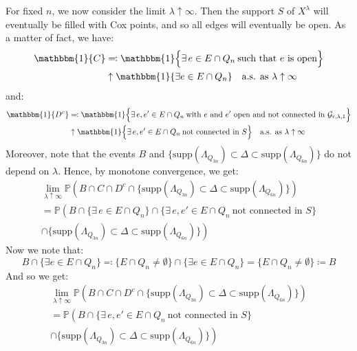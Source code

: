 \documentclass[10pt,a4paper]{amsart}
\theoremstyle{exampstyle}
\theoremstyle{exampnotations}
\begin{document}
For fixed $n$, we now consider the limit $\lambda \uparrow \infty$. Then the support $S$ of $X^{\lambda}$ will eventually be filled with Cox points, and so all edges will eventually be open. As a matter of fact, we have:
\begin{align*}
    \mathbbm{1} \lbrace C \rbrace &\eqqcolon \mathbbm{1} \Big\lbrace \exists \, e \in E\cap Q_n \: \text{such that $e$ is open} \Big\rbrace 
    \\ &\uparrow \mathbbm{1} \lbrace \exists e \in E\cap Q_n \rbrace \quad \text{a.s. as $\lambda \uparrow \infty$}
\end{align*}
and: \begin{align*}
     \mathbbm{1} \lbrace D^c \rbrace &\eqqcolon \mathbbm{1} \Big\lbrace \exists \, e,e' \in E\cap Q_n \: \text{with $e$ and $e'$ open and not connected in } \mathcal{G}_{r,\lambda,1}  \Big\rbrace 
     \\ &\uparrow \mathbbm{1} \Big\lbrace \exists \, e,e' \in E\cap Q_n \: \text{not connected in } S  \Big\rbrace \quad \text{a.s. as $\lambda \uparrow \infty$}
\end{align*}
Moreover, note that the events $B$ and $\Big\lbrace \text{supp}(\Lambda_{Q_{3n}}) \subset \Delta \subset \text{supp}(\Lambda_{Q_{6n}}) \Big\rbrace$ do not depend on $\lambda$. Hence, by monotone convergence, we get:
\begin{gather*}
    \lim_{\lambda \uparrow \infty} \mathbb{P}\left(B \cap C \cap D^c  \cap \Big\lbrace \text{supp}(\Lambda_{Q_{3n}}) \subset \Delta \subset \text{supp}(\Lambda_{Q_{6n}}) \Big\rbrace \right) 
    \\ = \mathbb{P}\left(B \cap \Big\lbrace \exists \, e \in E \cap Q_n \Big\rbrace \cap \Big\lbrace \exists \, e,e' \in E\cap Q_n \: \text{not connected in } S  \Big\rbrace \right. \\ \left. \cap \Big\lbrace \text{supp}(\Lambda_{Q_{3n}}) \subset \Delta \subset \text{supp}(\Lambda_{Q_{6n}}) \Big\rbrace  \right)
\end{gather*}
Now we note that:
\begin{equation*}
    B \cap \lbrace \exists e \in E \cap Q_n \rbrace \eqqcolon \lbrace E \cap Q_n \neq \emptyset \rbrace \cap \lbrace \exists e \in E \cap Q_n \rbrace = \lbrace E \cap Q_n \neq \emptyset \rbrace \coloneqq B
\end{equation*}
And so we get:
\begin{gather*}
    \lim_{\lambda \uparrow \infty} \mathbb{P}\left(B \cap C \cap D^c  \cap \Big\lbrace \text{supp}(\Lambda_{Q_{3n}}) \subset \Delta \subset \text{supp}(\Lambda_{Q_{6n}}) \Big\rbrace \right) 
    \\ = \mathbb{P}\left(B  \cap \Big\lbrace \exists \, e,e' \in E\cap Q_n \: \text{not connected in } S  \Big\rbrace \right. \\ \left. \cap \Big\lbrace \text{supp}(\Lambda_{Q_{3n}}) \subset \Delta \subset \text{supp}(\Lambda_{Q_{6n}}) \Big\rbrace  \right)
\end{gather*}
\end{document}
